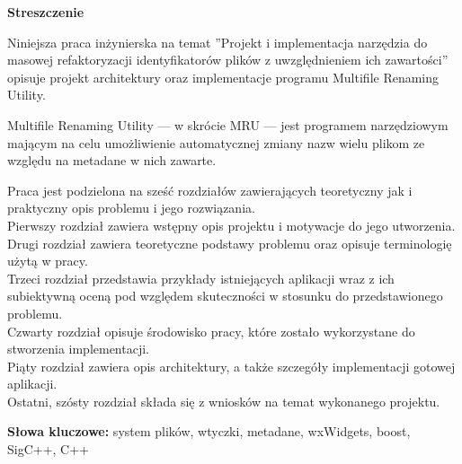 \clearpage

\begin{center}
\textbf{Streszczenie}
\end{center}

\par
Niniejsza praca inżynierska na temat ''Projekt i implementacja narzędzia do masowej refaktoryzacji identyfikatorów plików z uwzględnieniem ich zawartości'' opisuje projekt architektury oraz implementacje programu Multifile Renaming Utility.
\par
Multifile Renaming Utility --- w skrócie MRU --- jest programem narzędziowym mającym na celu umożliwienie automatycznej zmiany nazw wielu plikom ze względu na metadane w nich zawarte.

\par
Praca jest podzielona na sześć rozdziałów zawierających teoretyczny jak i praktyczny opis problemu i jego rozwiązania.\\
Pierwszy rozdział zawiera wstępny opis projektu i motywacje do jego utworzenia.\\
Drugi rozdział zawiera teoretyczne podstawy problemu oraz opisuje terminologię użytą w pracy.\\
Trzeci rozdział przedstawia przykłady istniejących aplikacji wraz z ich subiektywną oceną pod względem skuteczności w stosunku do przedstawionego problemu.\\
Czwarty rozdział opisuje środowisko pracy, które zostało wykorzystane do stworzenia implementacji.\\
Piąty rozdział zawiera opis architektury, a także szczegóły implementacji gotowej aplikacji.\\
Ostatni, szósty rozdział składa się z wniosków na temat wykonanego projektu.

\vspace*{\baselineskip}

\noindent\textbf{Słowa kluczowe:} system plików, wtyczki, metadane, wxWidgets, boost, SigC++, C++
